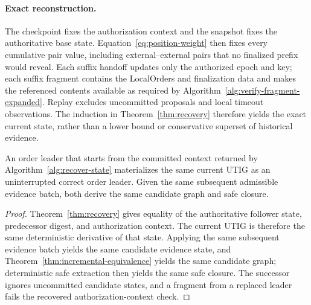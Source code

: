 \paragraph{Exact reconstruction.}
The checkpoint fixes the authorization context and the snapshot fixes the
authoritative base state.  Equation~\eqref{eq:position-weight}
then fixes every cumulative pair value, including external--external pairs
that no finalized prefix would reveal.  Each suffix handoff updates only the
authorized epoch and key; each suffix fragment contains the LocalOrders and
finalization data and makes the referenced contents available as required by
Algorithm~\ref{alg:verify-fragment-expanded}.  Replay excludes uncommitted
proposals and local timeout observations.
The induction in Theorem~\ref{thm:recovery} therefore yields the exact current
state, rather than a lower bound or conservative superset of historical
evidence.

\begin{corollary}
\label{cor:handoff-continuity}
An order leader that starts from the committed context returned by
Algorithm~\ref{alg:recover-state} materializes the same current UTIG as an
uninterrupted correct order leader.  Given the same subsequent admissible
evidence batch, both derive the same candidate graph and safe closure.
\end{corollary}

\begin{proof}
Theorem~\ref{thm:recovery} gives equality of the authoritative follower state,
predecessor digest, and authorization context.  The current UTIG is therefore
the same deterministic derivative of that state.  Applying the same subsequent
evidence batch yields the same candidate evidence state, and
Theorem~\ref{thm:incremental-equivalence} yields the same candidate graph;
deterministic safe extraction then yields the same safe closure.  The successor
ignores uncommitted candidate states, and a fragment from a replaced leader
fails the recovered authorization-context check.
\end{proof}
